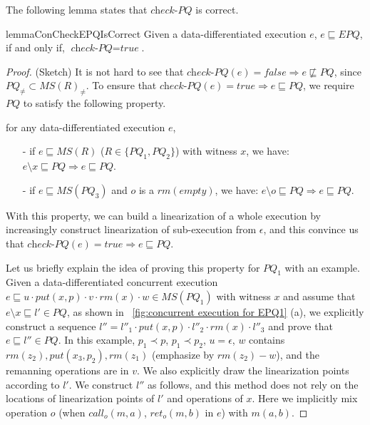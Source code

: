 The following lemma states that $\textit{check-PQ}$ is correct. 

\begin{restatable}{lemma}{ConCheckEPQIsCorrect}
\label{lemma:con-check-EPQ is correct}
Given a data-differentiated execution $e$, $e \sqsubseteq \textit{EPQ}$, if and only if, $\textit{check-PQ} = \textit{true}$.
\end{restatable} 

\begin {proof} (Sketch)
It is not hard to see that $\textit{check-PQ}(e) = \textit{false} \Rightarrow e \not\sqsubseteq \textit{PQ}$, since $\textit{PQ}_{\neq} \subset \textit{MS}(R)_{\neq}$. To ensure that $\textit{check-PQ}(e) = \textit{true} \Rightarrow e \sqsubseteq \textit{PQ}$, we require $\textit{PQ}$ to satisfy the following property.  

for any data-differentiated execution $e$,
\begin{itemize}
\setlength{\itemsep}{0.5pt}
\item[-] if $e \sqsubseteq \textit{MS}(R)$ ($R \in \{ \textit{PQ}_1, \textit{PQ}_2 \}$) with witness $x$, we have: $e \setminus x \sqsubseteq \textit{PQ} \Rightarrow e \sqsubseteq \textit{PQ}$.

\item[-] if $e \sqsubseteq \textit{MS}(\textit{PQ}_3)$ and $o$ is a $\textit{rm}(\textit{empty})$, we have: $e \setminus o \sqsubseteq \textit{PQ} \Rightarrow e \sqsubseteq \textit{PQ}$.
\end{itemize}

With this property, we can build a linearization of a whole execution by increasingly construct linearization of sub-execution from $\epsilon$, and this convince us that $\textit{check-PQ}(e) = \textit{true} \Rightarrow e \sqsubseteq \textit{PQ}$. 

Let us briefly explain the idea of proving this property for $\textit{PQ}_1$ with an example. Given a data-differentiated concurrent execution $e \sqsubseteq u \cdot \textit{put}(x,p) \cdot v \cdot \textit{rm}(x) \cdot w \in \textit{MS}(\textit{PQ}_1)$ with witness $x$ and assume that $e \setminus x \sqsubseteq l' \in \textit{PQ}$, as shown in \figurename~\ref{fig:concurrent execution for EPQ1} (a), we explicitly construct a sequence $l''= l''_1 \cdot \textit{put}(x,p) \cdot l''_2 \cdot \textit{rm}(x) \cdot l''_3$ and prove that $e \sqsubseteq l'' \in \textit{PQ}$. In this example, $p_1 \prec p$, $p_1 \prec p_2$, $u=\epsilon$, $w$ contains $\textit{rm}(z_2), \textit{put}(x_3,p_2), \textit{rm}(z_1)$ (emphasize by $\textit{rm}(z_2)-w$), and the remanning operations are in $v$. We also explicitly draw the linearization points according to $l'$. We construct $l''$ as follows, and this method does not rely on the locations of linearization points of $l'$ and operations of $x$. Here we implicitly mix operation $o$ (when $\textit{call}_o(m,a)$, $\textit{ret}_o(m,b)$ in $e$) with $m(a,b)$.


\end{proof}
